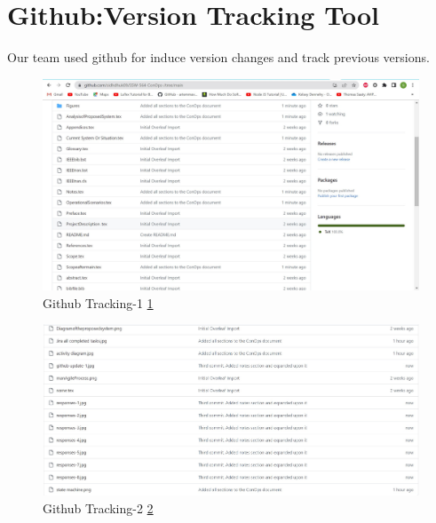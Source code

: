 \section{  Github:Version Tracking Tool \cite{github}\label{Section::Github Version Tracking Tool} }

Our team used github for induce version changes and track previous versions. 

\begin{figure}[H]
    \centering
    \includegraphics[scale=0.43]{Figures/github update-1.jpg}
    \caption{Github Tracking-1 \ref{fig::github update-1.jpg}}
    \label{fig::github update-1.jpg}
\end{figure}
\begin{figure}[H]
    \centering
    \includegraphics[scale=0.43]{Figures/github update-2.jpg}
    \caption{ Github Tracking-2 \ref{fig::github update-2.jpg}}
    \label{fig::github update-2.jpg}
\end{figure}